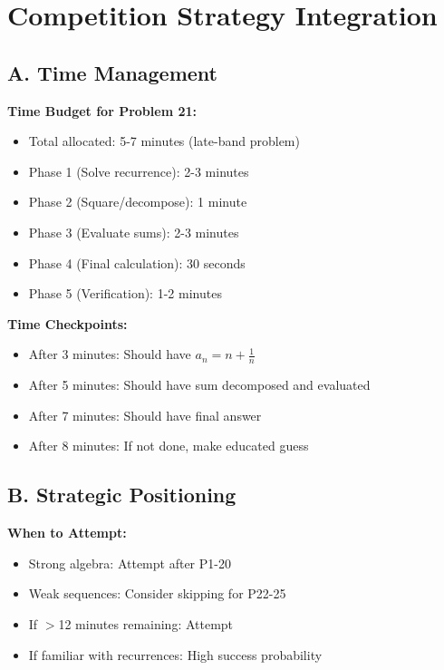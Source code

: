 \documentclass[12pt]{article}
\begin{document}
\section{Competition Strategy Integration}

\begin{competitionbox}

\subsection*{A. Time Management}

\textbf{Time Budget for Problem 21:}
\begin{itemize}
    \item Total allocated: 5-7 minutes (late-band problem)
    \item Phase 1 (Solve recurrence): 2-3 minutes
    \item Phase 2 (Square/decompose): 1 minute
    \item Phase 3 (Evaluate sums): 2-3 minutes
    \item Phase 4 (Final calculation): 30 seconds
    \item Phase 5 (Verification): 1-2 minutes
\end{itemize}

\textbf{Time Checkpoints:}
\begin{itemize}
    \item After 3 minutes: Should have $a_n = n + \frac{1}{n}$
    \item After 5 minutes: Should have sum decomposed and evaluated
    \item After 7 minutes: Should have final answer
    \item After 8 minutes: If not done, make educated guess
\end{itemize}

\subsection*{B. Strategic Positioning}

\textbf{When to Attempt:}
\begin{itemize}
    \item Strong algebra: Attempt after P1-20
    \item Weak sequences: Consider skipping for P22-25
    \item If $>$12 minutes remaining: Attempt
    \item If familiar with recurrences: High success probability
\end{itemize}


\end{competitionbox}
\end{document}
